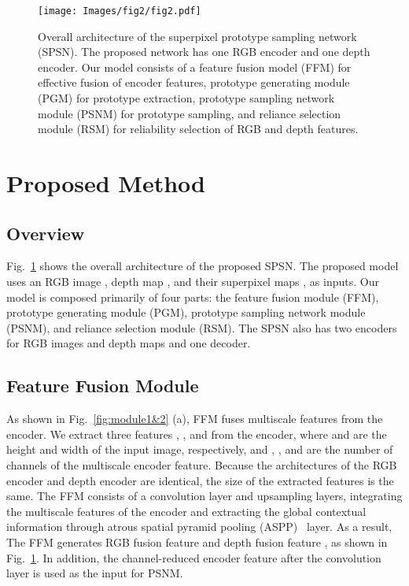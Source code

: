 \documentclass[runningheads]{llncs}
\begin{document}
	\begin{figure}[t]
		\setlength{\belowcaptionskip}{-24pt}
		\begin{center}
			\texttt{[image: Images/fig2/fig2.pdf]}
			\caption{Overall architecture of the superpixel prototype sampling network (SPSN). The proposed network has one RGB encoder and one depth encoder. Our model consists of a feature fusion model (FFM) for effective fusion of encoder features, prototype generating module (PGM) for prototype extraction, prototype sampling network module (PSNM) for prototype sampling, and reliance selection module (RSM) for reliability selection of RGB and depth features.}
			\label{fig:model}
		\end{center}
	\end{figure}
	
	\section{Proposed Method}
	\subsection{Overview}
	Fig.~\ref{fig:model} shows the overall architecture of the proposed SPSN. The proposed model uses an RGB image , depth map , and their superpixel maps ,  as inputs. Our model is composed primarily of four parts: the feature fusion module (FFM), prototype generating module (PGM), prototype sampling network module (PSNM), and reliance selection module (RSM). The SPSN also has two encoders for RGB images and depth maps and one decoder.
	
	\subsection{Feature Fusion Module}
	As shown in Fig.~\ref{fig:module1&2} (a), FFM fuses multiscale features from the encoder. We extract three features , , and  from the encoder, where  and  are the height and width of the input image, respectively, and ,  , and  are the number of channels of the multiscale encoder feature. Because the architectures of the RGB encoder and depth encoder are identical, the size of the extracted features is the same. The FFM consists of a  convolution layer and upsampling layers, integrating the multiscale features of the encoder and extracting the global contextual information through atrous spatial pyramid pooling (ASPP)~\cite{chen2017deeplab} layer. As a result, The FFM generates RGB fusion feature  and depth fusion feature , as shown in Fig.~\ref{fig:model}. In addition, the channel-reduced encoder feature  after the  convolution layer is used as the input for PSNM.
	
\end{document}

